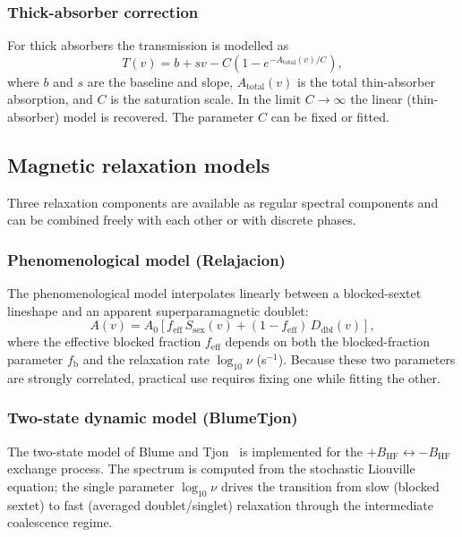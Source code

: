 \documentclass[smallcondensed]{svjour3}
\begin{document}
\subsubsection{Thick-absorber correction}
\label{sec:thick}

For thick absorbers the transmission is modelled as~\cite{margulies1961}
\begin{equation}
  T(v) = b + sv - C\!\left(1 - e^{-A_\mathrm{total}(v)/C}\right),
\end{equation}
where $b$ and $s$ are the baseline and slope, $A_\mathrm{total}(v)$ is the
total thin-absorber absorption, and $C$ is the saturation scale. In the
limit $C\to\infty$ the linear (thin-absorber) model is recovered. The
parameter $C$ can be fixed or fitted.

\subsection{Magnetic relaxation models}
\label{sec:relax}

Three relaxation components are available as regular spectral components and
can be combined freely with each other or with discrete phases.

\subsubsection{Phenomenological model (Relajacion)}
\label{sec:relajacion}

The phenomenological model interpolates linearly between a blocked-sextet
lineshape and an apparent superparamagnetic doublet:
\begin{equation}
  A(v) = A_0\!\left[f_\mathrm{eff}\,S_\mathrm{sex}(v)
         + (1 - f_\mathrm{eff})\,D_\mathrm{dbl}(v)\right],
\end{equation}
where the effective blocked fraction $f_\mathrm{eff}$ depends on both the
blocked-fraction parameter $f_\mathrm{b}$ and the relaxation rate
$\log_{10}\nu$ (s$^{-1}$). Because these two parameters are strongly
correlated, practical use requires fixing one while fitting the other.

\subsubsection{Two-state dynamic model (BlumeTjon)}
\label{sec:blumetjon}

The two-state model of Blume and Tjon~\cite{blumetjon1968} is implemented
for the $+B_\mathrm{HF} \leftrightarrow -B_\mathrm{HF}$ exchange process.
The spectrum is computed from the stochastic Liouville equation; the single
parameter $\log_{10}\nu$ drives the transition from slow (blocked sextet) to
fast (averaged doublet/singlet) relaxation through the intermediate
coalescence regime.
\end{document}
